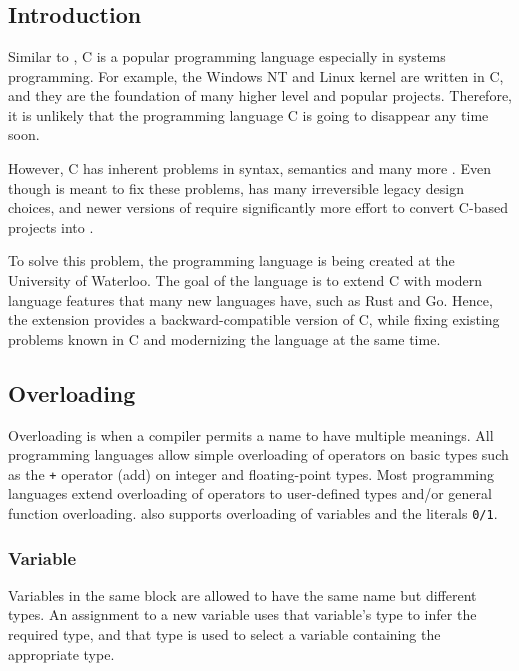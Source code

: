 \chapter{\CFA} \label{CFA}

\section{Introduction}
Similar to \CC, C is a popular programming language especially in systems
programming. For example, the Windows NT and Linux kernel are written in C, and they are the foundation of many higher level
and popular projects. Therefore, it is unlikely that the programming language C is
going to disappear any time soon.

However, C has inherent problems in syntax, semantics and many
more \cite{Reference2}. Even though \CCS is meant to fix these problems, \CCS has many
irreversible legacy design choices, and newer versions of \CCS require significantly more effort to convert C-based projects into \CC.

To solve this problem, the programming language \CFAS is being created at the University of Waterloo. The goal
of the language is to extend C with modern language features that many new
languages have, such as Rust and Go. Hence, the \CFAS extension provides a
backward-compatible version of C, while fixing existing problems known in C and
modernizing the language at the same time.

\section{Overloading}
Overloading is when a compiler permits a name to have multiple meanings. All
programming languages allow simple overloading of operators on basic types such
as the \verb|+| operator (add) on integer and floating-point types. Most programming languages extend
overloading of operators to user-defined types and/or general function
overloading. \CFAS also supports overloading of variables and the literals \verb|0/1|.

\subsection{Variable}
Variables in the same block are allowed to have the same name but different
types. An assignment to a new variable uses that variable's type to infer the
required type, and that type is used to select a variable containing the appropriate type.

